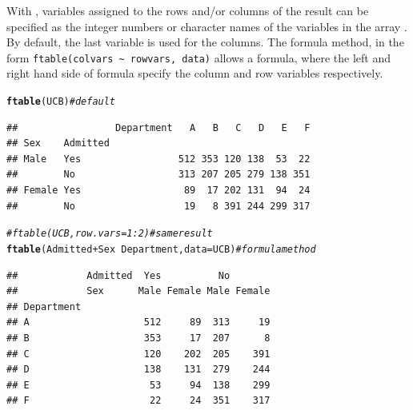 \documentclass[11pt]{book}\usepackage[]{graphicx}\usepackage[]{color}
\makeatletter
\newcommand{\hlcom}[1]{\textcolor[rgb]{0.678,0.584,0.686}{\textit{#1}}}%
\newcommand{\hlopt}[1]{\textcolor[rgb]{0,0,0}{#1}}%
\newcommand{\hlstd}[1]{\textcolor[rgb]{0.345,0.345,0.345}{#1}}%
\newcommand{\hlkwc}[1]{\textcolor[rgb]{0.333,0.667,0.333}{#1}}%
\newcommand{\hlkwd}[1]{\textcolor[rgb]{0.737,0.353,0.396}{\textbf{#1}}}%
\newenvironment{kframe}{%
 \def\at@end@of@kframe{}%
 \ifinner\ifhmode%
  \def\at@end@of@kframe{\end{minipage}}%
  \begin{minipage}{\columnwidth}%
 \fi\fi%
 \def\FrameCommand##1{\hskip\@totalleftmargin \hskip-\fboxsep
 \colorbox{shadecolor}{##1}\hskip-\fboxsep
     \hskip-\linewidth \hskip-\@totalleftmargin \hskip\columnwidth}%
 \MakeFramed {\advance\hsize-\width
   \@totalleftmargin\z@ \linewidth\hsize
   \@setminipage}}%
 {\par\unskip\endMakeFramed%
 \at@end@of@kframe}
\newenvironment{knitrout}{}{} %
\renewenvironment{knitrout}{\small\renewcommand{\baselinestretch}{.85}}{} %
\makeatother
\begin{document}
With , variables assigned to the rows and/or columns of the result
can be specified as the integer numbers or character names of the variables in
the array . By default, the last variable is used for the columns.
The formula method, in the form \verb|ftable(colvars ~ rowvars, data)|
allows a formula, where the left and right hand side of formula specify the column and row variables respectively.

\begin{knitrout}
\color{fgcolor}\begin{kframe}
\begin{alltt}
 \hlkwd{ftable}\hlstd{(UCB)}                    \hlcom{# default}
\end{alltt}
\begin{verbatim}
##                 Department   A   B   C   D   E   F
## Sex    Admitted                                   
## Male   Yes                 512 353 120 138  53  22
##        No                  313 207 205 279 138 351
## Female Yes                  89  17 202 131  94  24
##        No                   19   8 391 244 299 317
\end{verbatim}
\begin{alltt}
\hlcom{#ftable(UCB, row.vars=1:2)      # same result}
 \hlkwd{ftable}\hlstd{(Admitted} \hlopt{+} \hlstd{Sex} \hlopt{~} \hlstd{Department,} \hlkwc{data}\hlstd{=UCB)}   \hlcom{# formula method}
\end{alltt}
\begin{verbatim}
##            Admitted  Yes          No       
##            Sex      Male Female Male Female
## Department                                 
## A                    512     89  313     19
## B                    353     17  207      8
## C                    120    202  205    391
## D                    138    131  279    244
## E                     53     94  138    299
## F                     22     24  351    317
\end{verbatim}
\end{kframe}
\end{knitrout}
\end{document}
